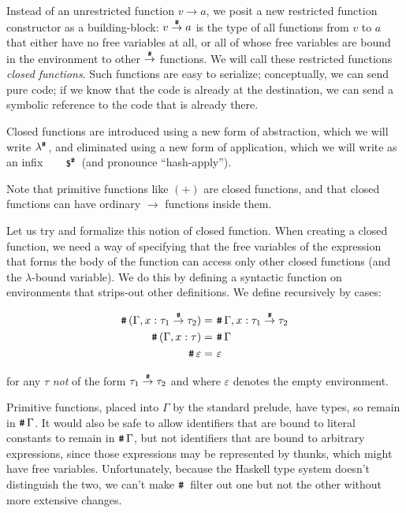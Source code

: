 \documentclass[preprint]{sigplanconf}
\begin{document}
Instead of an unrestricted function $v \rightarrow a$, we posit a new restricted function constructor as a building-block: $v \stackrel{\texttt{\#}}{\rightarrow} a$ is the type of all functions from $v$ to $a$ that either have no free variables at all, or all of whose free variables are bound in the environment to other $\stackrel{\texttt{\#}}{\rightarrow}$ functions. We will call these restricted functions {\em closed functions}. Such functions are easy to serialize; conceptually, we can send pure code; if we know that the code is already at the destination, we can send a symbolic reference to the code that is already there.  

Closed functions are introduced using a new form of abstraction, which we will write $\lambda^{\texttt{\#}}\,$, and eliminated using a new form of application, which we will write as an infix $\napp$ (and pronounce ``hash-apply'').

Note that primitive functions like $(+)$ are closed functions, and that closed functions can have ordinary $\rightarrow$ functions inside them.  

Let us try and formalize this notion of closed function.  
When creating a closed function, we need a way of specifying that the free variables of the expression that forms the body of the function can access only other closed functions (and the $\lambda$-bound variable).  We do this by defining a syntactic function \closed{} on environments that strips-out other definitions.  We define \closed{} recursively by cases:

\begin{align*}
	\texttt{\#}\,(\Gamma , x: \tau_1 \stackrel{\texttt{\#}}{\rightarrow} \tau_2) 		=& ~ \texttt{\#}\,\Gamma , x: \tau_1 \stackrel{\texttt{\#}}{\rightarrow} \tau_2 \\
	\texttt{\#}\,(\Gamma , x: \tau)						=& ~ \texttt{\#}\,\Gamma   \\
	\texttt{\#}\,\varepsilon 								=& ~ \varepsilon 
\end{align*}

for any $\tau$ \emph{not} of the form $\tau_1 \stackrel{\texttt{\#}}{\rightarrow}{} \tau_2$ and
where $\varepsilon$ denotes the empty environment.

Primitive functions, placed into $\Gamma$ by the standard prelude, have \nfn{} types, so remain in $\texttt{\#}\,\Gamma$.
It would also be safe to allow identifiers that are bound to literal constants to remain in $\texttt{\#}\,\Gamma$, but not  identifiers that are bound to
arbitrary expressions, since those expressions may be represented by thunks, which might have free variables.  Unfortunately, because the Haskell type system doesn't distinguish the two, we can't make $\closed$ filter out one but not the other without more extensive changes.
\end{document}
